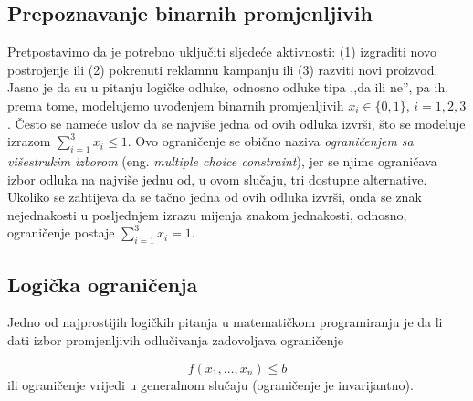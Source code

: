 \documentclass[a4paper, utf8, 11pt, colorlinks]{book}
\theoremstyle{definition}
\begin{document}
\subsection{Prepoznavanje binarnih promjenljivih}
 Pretpostavimo da je potrebno uključiti sljedeće aktivnosti: (1) izgraditi novo postrojenje ili
(2) pokrenuti reklamnu kampanju ili (3) razviti novi proizvod. Jasno je da su u pitanju logičke odluke, odnosno odluke tipa ,,da ili ne'', pa ih, prema tome, modelujemo   uvođenjem  binarnih promjenljivih $x_i \in \{0, 1 \}$, $i=1,2,3$. Često se nameće uslov da se najviše jedna od ovih odluka izvrši, što se modeluje izrazom $\sum_{i=1}^3 x_i \leq 1$. Ovo ograničenje se obično naziva \emph{ograničenjem sa višestrukim izborom} (eng. \emph{multiple choice constraint}), jer se njime ograničava izbor odluka na najviše jednu od, u ovom slučaju, tri dostupne alternative. Ukoliko se zahtijeva da se tačno jedna od ovih odluka izvrši, onda se znak nejednakosti u posljednjem izrazu mijenja znakom jednakosti, odnosno, ograničenje postaje $\sum_{i=1}^3 x_i = 1$.

\subsection{Logička ograničenja}
Jedno od najprostijih logičkih pitanja u matematičkom programiranju je da li dati izbor promjenljivih odlučivanja zadovoljava ograničenje

\begin{equation}\label{eq:constr-ex-1-ilp}
   f(x_1,\ldots, x_n )\leq b
\end{equation}
 ili   ograničenje vrijedi u generalnom slučaju (ograničenje je invarijantno). 
 
\end{document}
